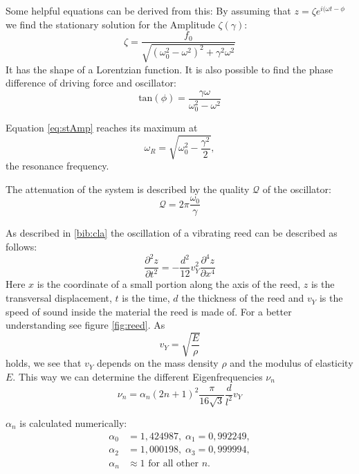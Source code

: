\documentclass[twoside, a4paper, DIV=11,twocolumn, 12pt]{book}
\begin{document}
Some helpful equations can be derived from this:
By assuming that $z = \zeta e^{i(\omega t - \phi}$ we find the stationary solution for the Amplitude $\zeta (\gamma)$:
\begin{equation}
 \zeta = \frac{f_0}{\sqrt{(\omega_0^2 - \omega^2)^2 + \gamma^2\omega^2}}
\end{equation}
It has the shape of a Lorentzian function.
It is also possible to find the phase difference of driving force and oscillator:
\begin{equation}
 \mathrm{tan}(\phi) = \frac{\gamma\omega}{\omega_0^2 - \omega^2}
\end{equation}

Equation \ref{eq:stAmp} reaches its maximum at
\begin{equation}
 \omega_R = \sqrt{\omega_0^2 - \frac{\gamma^2}{2}} \mathrm{,}
\end{equation}
the resonance frequency.

The attenuation of the system is described by the quality $\mathcal{Q}$ of the oscillator:
\begin{equation}
 \mathcal{Q} = 2\pi\frac{\omega_0}{\gamma}
\end{equation}


As described in \ref{bib:cla} the oscillation of a vibrating reed can be described as follows:
\begin{equation}
 \frac{\partial^2 z}{\partial t^2} = -\frac{d^2}{12} v_Y^2 \frac{\partial^4 z}{\partial x^4}
\end{equation}
Here $x$ is the coordinate of a small portion along the axis of the reed, $z$ is the transversal displacement, $t$ is the time, $d$ the thickness of the reed and $v_Y$ is the speed of sound inside the material the reed is made of. For a better understanding see figure \ref{fig:reed}.
As 
\begin{equation}
 v_Y = \sqrt{\frac{E}{\rho}}
\end{equation}
holds, we see that $v_Y$ depends on the mass density $\rho$ and the modulus of elasticity $E$.
This way we can determine the different Eigenfrequencies $\nu_n$
\begin{equation}
 \nu_n = \alpha_n (2n+1)^2 \frac{\pi}{16\sqrt{3}} \frac{d}{l^2} v_Y
\end{equation}

$\alpha_n$ is calculated numerically:
\begin{align}
 \alpha_0 &= 1,424987 \mathrm{,}\; \alpha_1 = 0,992249 \mathrm{,} \\ 
 \alpha_2 &= 1,000198 \mathrm{,}\; \alpha_3 = 0,999994 \mathrm{,} \\
 \alpha_n &\approx 1 \text{ for all other } n.
\end{align}
\end{document}
